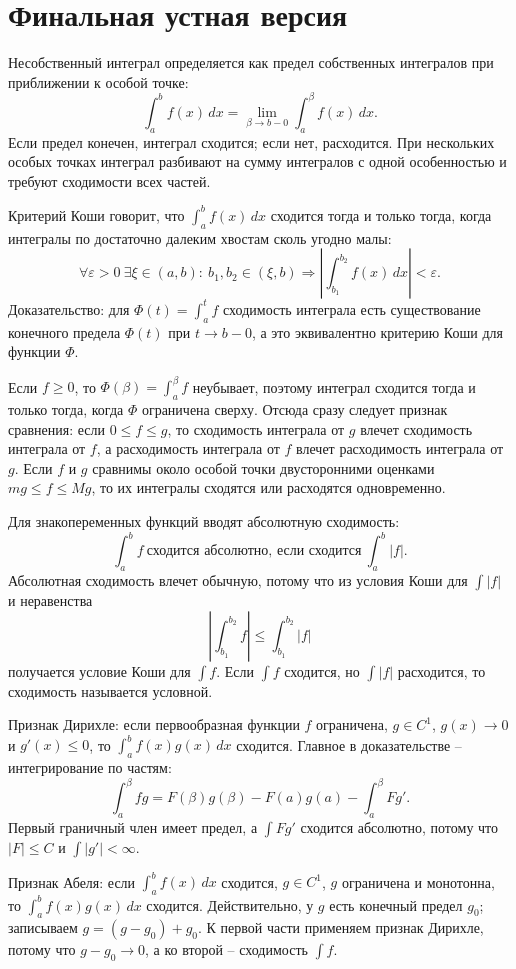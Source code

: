 \documentclass[12pt,a4paper]{article}
\newcommand{\eps}{\varepsilon}
\newcommand{\dd}{\,d}
\begin{document}
\section*{Финальная устная версия}

Несобственный интеграл определяется как предел собственных интегралов при
приближении к особой точке:
\[
  \int_a^b f(x)\dd x=\lim_{\beta\to b-0}\int_a^\beta f(x)\dd x.
\]
Если предел конечен, интеграл сходится; если нет, расходится. При нескольких
особых точках интеграл разбивают на сумму интегралов с одной особенностью и
требуют сходимости всех частей.

Критерий Коши говорит, что \(\int_a^b f(x)\dd x\) сходится тогда и только
тогда, когда интегралы по достаточно далеким хвостам сколь угодно малы:
\[
  \forall\eps>0\ \exists\xi\in(a,b):\
  b_1,b_2\in(\xi,b)\Rightarrow
  \left|\int_{b_1}^{b_2}f(x)\dd x\right|<\eps .
\]
Доказательство: для \(\Phi(t)=\int_a^t f\) сходимость интеграла есть
существование конечного предела \(\Phi(t)\) при \(t\to b-0\), а это
эквивалентно критерию Коши для функции \(\Phi\).

Если \(f\ge0\), то \(\Phi(\beta)=\int_a^\beta f\) неубывает, поэтому интеграл
сходится тогда и только тогда, когда \(\Phi\) ограничена сверху. Отсюда сразу
следует признак сравнения: если \(0\le f\le g\), то сходимость интеграла от
\(g\) влечет сходимость интеграла от \(f\), а расходимость интеграла от \(f\)
влечет расходимость интеграла от \(g\). Если \(f\) и \(g\) сравнимы около
особой точки двусторонними оценками \(m g\le f\le M g\), то их интегралы
сходятся или расходятся одновременно.

Для знакопеременных функций вводят абсолютную сходимость:
\[
  \int_a^b f\ \text{сходится абсолютно, если сходится}\ \int_a^b |f|.
\]
Абсолютная сходимость влечет обычную, потому что из условия Коши для
\(\int |f|\) и неравенства
\[
  \left|\int_{b_1}^{b_2} f\right|\le\int_{b_1}^{b_2}|f|
\]
получается условие Коши для \(\int f\). Если \(\int f\) сходится, но
\(\int |f|\) расходится, то сходимость называется условной.

Признак Дирихле: если первообразная функции \(f\) ограничена, \(g\in C^1\),
\(g(x)\to0\) и \(g'(x)\le0\), то \(\int_a^b f(x)g(x)\dd x\) сходится. Главное
в доказательстве -- интегрирование по частям:
\[
  \int_a^\beta fg=F(\beta)g(\beta)-F(a)g(a)-\int_a^\beta Fg'.
\]
Первый граничный член имеет предел, а \(\int Fg'\) сходится абсолютно, потому
что \(|F|\le C\) и \(\int |g'|<\infty\).

Признак Абеля: если \(\int_a^b f(x)\dd x\) сходится, \(g\in C^1\), \(g\)
ограничена и монотонна, то \(\int_a^b f(x)g(x)\dd x\) сходится. Действительно,
у \(g\) есть конечный предел \(g_0\); записываем \(g=(g-g_0)+g_0\). К первой
части применяем признак Дирихле, потому что \(g-g_0\to0\), а ко второй --
сходимость \(\int f\).
\end{document}
